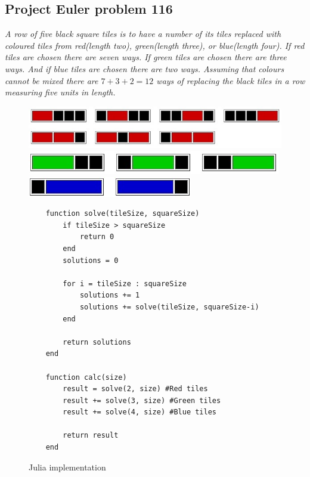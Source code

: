 \documentclass[landscape, a0]{sciposter}
\begin{document}
\begin{multicols}{3}
\section{Project Euler problem 116}
\textit{A row of five black square tiles is to have a number of its tiles replaced with coloured tiles from red(length two), green(length three), or blue(length four). If red tiles are chosen there are seven ways. If green tiles are chosen there are three ways. And if blue tiles are chosen there are two ways. Assuming that colours cannot be mixed there are $7+3+2=12$ ways of replacing the black tiles in a row measuring five units in length.}
\hspace*{-1in}
\begin{figure}[H]
	\centering
	\includegraphics[scale=1.635]{fig/1161.jpg}
	\includegraphics[scale=2.2]{fig/1162.jpg} 
	\includegraphics[scale=2.2]{fig/1163.jpg} 
\end{figure}
\begin{figure}[H]
	\centering
	\begin{lstlisting}
	function solve(tileSize, squareSize)
		if tileSize > squareSize
			return 0
		end
		solutions = 0
	
		for i = tileSize : squareSize
			solutions += 1
			solutions += solve(tileSize, squareSize-i)
		end
	
		return solutions
	end
	
	function calc(size)
		result = solve(2, size) #Red tiles
		result += solve(3, size) #Green tiles
		result += solve(4, size) #Blue tiles
	
		return result
	end
	\end{lstlisting}
	\caption{Julia implementation}
\end{figure}


\end{multicols}
\end{document}
